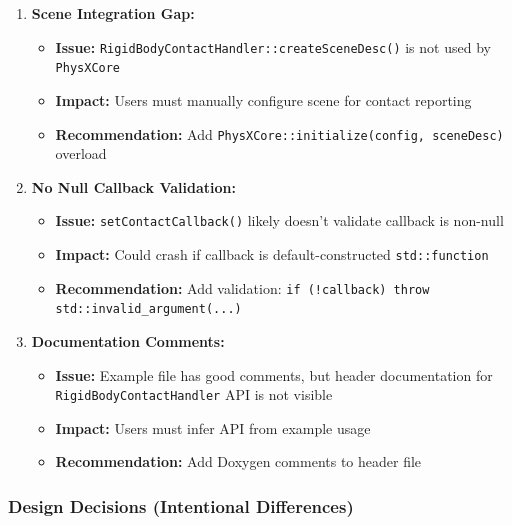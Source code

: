 \begin{enumerate}
    \item \textbf{Scene Integration Gap:}
    \begin{itemize}
        \item \textbf{Issue:} \texttt{RigidBodyContactHandler::createSceneDesc()} is not used by \texttt{PhysXCore}
        \item \textbf{Impact:} Users must manually configure scene for contact reporting
        \item \textbf{Recommendation:} Add \texttt{PhysXCore::initialize(config, sceneDesc)} overload
    \end{itemize}

    \item \textbf{No Null Callback Validation:}
    \begin{itemize}
        \item \textbf{Issue:} \texttt{setContactCallback()} likely doesn't validate callback is non-null
        \item \textbf{Impact:} Could crash if callback is default-constructed \texttt{std::function}
        \item \textbf{Recommendation:} Add validation: \texttt{if (!callback) throw std::invalid\_argument(...)}
    \end{itemize}

    \item \textbf{Documentation Comments:}
    \begin{itemize}
        \item \textbf{Issue:} Example file has good comments, but header documentation for \texttt{RigidBodyContactHandler} API is not visible
        \item \textbf{Impact:} Users must infer API from example usage
        \item \textbf{Recommendation:} Add Doxygen comments to header file
    \end{itemize}
\end{enumerate}

\subsubsection{Design Decisions (Intentional Differences)}

